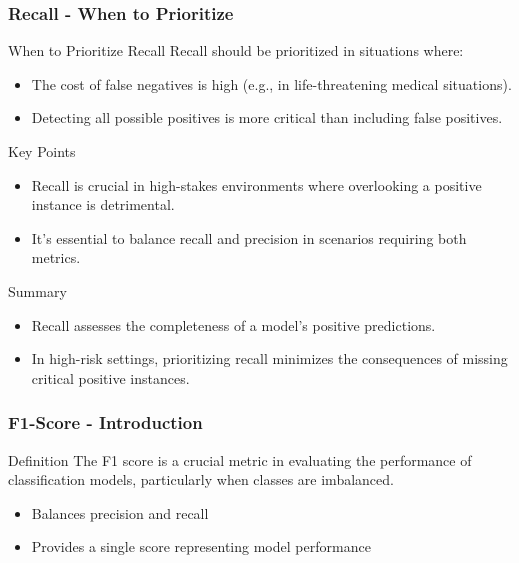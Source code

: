 \documentclass[aspectratio=169]{beamer}
\begin{document}
\begin{frame}[fragile]
    \frametitle{Recall - When to Prioritize}
    \begin{block}{When to Prioritize Recall}
        Recall should be prioritized in situations where:
    \end{block}
    
    \begin{itemize}
        \item The cost of false negatives is high (e.g., in life-threatening medical situations).
        \item Detecting all possible positives is more critical than including false positives.
    \end{itemize}
    
    \begin{block}{Key Points}
        \begin{itemize}
            \item Recall is crucial in high-stakes environments where overlooking a positive instance is detrimental.
            \item It’s essential to balance recall and precision in scenarios requiring both metrics.
        \end{itemize}
    \end{block}

    \begin{block}{Summary}
        \begin{itemize}
            \item Recall assesses the completeness of a model's positive predictions.
            \item In high-risk settings, prioritizing recall minimizes the consequences of missing critical positive instances.
        \end{itemize}
    \end{block}
\end{frame}

\begin{frame}[fragile]
    \frametitle{F1-Score - Introduction}
    \begin{block}{Definition}
        The F1 score is a crucial metric in evaluating the performance of classification models, particularly when classes are imbalanced.
    \end{block}
    \begin{itemize}
        \item Balances precision and recall
        \item Provides a single score representing model performance
    \end{itemize}
\end{frame}
\end{document}
